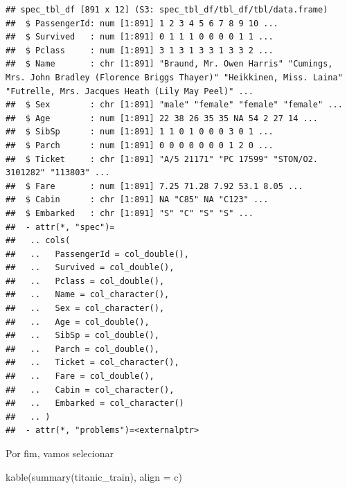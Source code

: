 \documentclass[
]{book}
\newenvironment{Shaded}{\begin{snugshade}}{\end{snugshade}}
\newcommand{\AttributeTok}[1]{\textcolor[rgb]{0.77,0.63,0.00}{#1}}
\newcommand{\FunctionTok}[1]{\textcolor[rgb]{0.00,0.00,0.00}{#1}}
\newcommand{\NormalTok}[1]{#1}
\newcommand{\StringTok}[1]{\textcolor[rgb]{0.31,0.60,0.02}{#1}}
\begin{document}
\begin{verbatim}
## spec_tbl_df [891 x 12] (S3: spec_tbl_df/tbl_df/tbl/data.frame)
##  $ PassengerId: num [1:891] 1 2 3 4 5 6 7 8 9 10 ...
##  $ Survived   : num [1:891] 0 1 1 1 0 0 0 0 1 1 ...
##  $ Pclass     : num [1:891] 3 1 3 1 3 3 1 3 3 2 ...
##  $ Name       : chr [1:891] "Braund, Mr. Owen Harris" "Cumings, Mrs. John Bradley (Florence Briggs Thayer)" "Heikkinen, Miss. Laina" "Futrelle, Mrs. Jacques Heath (Lily May Peel)" ...
##  $ Sex        : chr [1:891] "male" "female" "female" "female" ...
##  $ Age        : num [1:891] 22 38 26 35 35 NA 54 2 27 14 ...
##  $ SibSp      : num [1:891] 1 1 0 1 0 0 0 3 0 1 ...
##  $ Parch      : num [1:891] 0 0 0 0 0 0 0 1 2 0 ...
##  $ Ticket     : chr [1:891] "A/5 21171" "PC 17599" "STON/O2. 3101282" "113803" ...
##  $ Fare       : num [1:891] 7.25 71.28 7.92 53.1 8.05 ...
##  $ Cabin      : chr [1:891] NA "C85" NA "C123" ...
##  $ Embarked   : chr [1:891] "S" "C" "S" "S" ...
##  - attr(*, "spec")=
##   .. cols(
##   ..   PassengerId = col_double(),
##   ..   Survived = col_double(),
##   ..   Pclass = col_double(),
##   ..   Name = col_character(),
##   ..   Sex = col_character(),
##   ..   Age = col_double(),
##   ..   SibSp = col_double(),
##   ..   Parch = col_double(),
##   ..   Ticket = col_character(),
##   ..   Fare = col_double(),
##   ..   Cabin = col_character(),
##   ..   Embarked = col_character()
##   .. )
##  - attr(*, "problems")=<externalptr>
\end{verbatim}

Por fim, vamos selecionar

\begin{Shaded}
\begin{Highlighting}[]
\FunctionTok{kable}\NormalTok{(}\FunctionTok{summary}\NormalTok{(titanic\_train), }\AttributeTok{align =} \StringTok{\textquotesingle{}c\textquotesingle{}}\NormalTok{)}
\end{Highlighting}
\end{Shaded}
\end{document}
